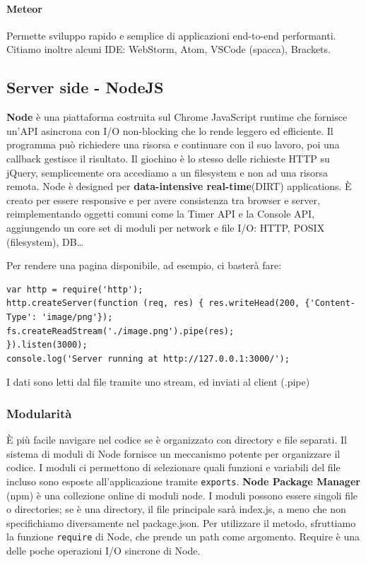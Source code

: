 \documentclass[11pt]{article}
\newcommand{\code}[1]{\texttt{#1}}
\begin{document}
\paragraph{Meteor} Permette sviluppo rapido e semplice di applicazioni end-to-end performanti. Citiamo inoltre alcuni IDE: WebStorm, Atom, VSCode (spacca), Brackets.
\subsection{Server side - NodeJS}
\textbf{Node} è una piattaforma costruita sul Chrome JavaScript runtime che fornisce un'API asincrona con I/O non-blocking che lo rende leggero ed efficiente. Il programma può richiedere una risorsa e continuare con il suo lavoro, poi una callback gestisce il risultato. Il giochino è lo stesso delle richieste HTTP su jQuery, semplicemente ora accediamo a un filesystem e non ad una risorsa remota. Node è designed per \textbf{data-intensive real-time}(DIRT) applications. È creato per essere responsive e per avere consistenza tra browser e server, reimplementando oggetti comuni come la Timer API e la Console API, aggiungendo un core set di moduli per network e file I/O: HTTP, POSIX (filesystem), DB\dots

Per rendere una pagina disponibile, ad esempio, ci basterà fare:
\begin{verbatim}
var http = require('http');
http.createServer(function (req, res) { res.writeHead(200, {'Content-Type': 'image/png'});
fs.createReadStream('./image.png').pipe(res);
}).listen(3000);
console.log('Server running at http://127.0.0.1:3000/');
\end{verbatim}
I dati sono letti dal file tramite uno stream, ed inviati al client (.pipe)
\subsubsection{Modularità}
È più facile navigare nel codice se è organizzato con directory e file separati. Il sistema di moduli di Node fornisce un meccanismo potente per organizzare il codice. I moduli ci permettono di selezionare quali funzioni e variabili del file incluso sono esposte all'applicazione tramite \code{exports}. \textbf{Node Package Manager} (npm) è una collezione online di moduli node. I moduli possono essere singoli file o directories; se è una directory, il file principale sarà index.js, a meno che non specifichiamo diversamente nel package.json. Per utilizzare il metodo, sfruttiamo la funzione \code{require} di Node, che prende un path come argomento. Require è una delle poche operazioni I/O sincrone di Node. 
\end{document}
